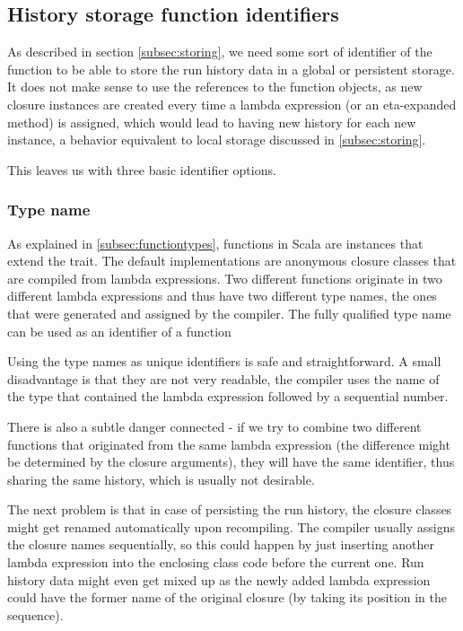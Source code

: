 \subsection{History storage function identifiers}
\label{subsec:function_identifiers}

As described in section \ref{subsec:storing}, we need some sort of identifier of the function to be able to store the run history data in a global or persistent storage. It does not make sense to use the references to the function objects, as new closure instances are created every time a lambda expression (or an eta-expanded method) is assigned, which would lead to having new history for each new instance, a behavior equivalent to local storage discussed in \ref{subsec:storing}.


This leaves us with three basic identifier options.

\subsubsection{Type name}

As explained in \ref{subsec:functiontypes}, functions in Scala are instances that extend the  trait. The default implementations are anonymous closure classes that are compiled from lambda expressions. Two different functions originate in two different lambda expressions and thus have two different type names, the ones that were generated and assigned by the compiler. The fully qualified type name can be used as an identifier of a function

Using the type names as unique identifiers is safe and straightforward. A small disadvantage is that they are not very readable, the compiler uses the name of the type that contained the lambda expression followed by a sequential number. 

There is also a subtle danger connected - if we try to combine two different functions that originated from the same lambda expression (the difference might be determined by the closure arguments), they will have the same identifier, thus sharing the same history, which is usually not desirable.

The next problem is that in case of persisting the run history, the closure classes might get renamed automatically upon recompiling. The compiler usually assigns the closure names sequentially, so this could happen by just inserting another lambda expression into the enclosing class code before the current one. Run history data might even get mixed up as the newly added lambda expression could have the former name of the original closure (by taking its position in the sequence).

